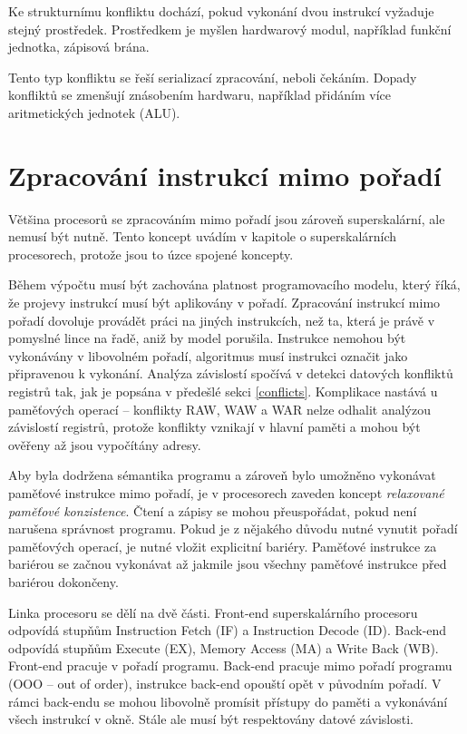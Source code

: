 Ke strukturnímu konfliktu dochází, pokud vykonání dvou instrukcí vyžaduje stejný prostředek.
Prostředkem je myšlen hardwarový modul, například funkční jednotka, zápisová brána.

Tento typ konfliktu se řeší serializací zpracování, neboli čekáním.
Dopady konfliktů se zmenšují znásobením hardwaru, například přidáním více aritmetických jednotek (ALU).

\section{Zpracování instrukcí mimo pořadí}
\label{chap:ooo}

Většina procesorů se zpracováním mimo pořadí jsou zároveň superskalární, ale nemusí být nutně.
Tento koncept uvádím v kapitole o superskalárních procesorech, protože jsou to úzce spojené koncepty.

Během výpočtu musí být zachována platnost programovacího modelu, který říká, že projevy instrukcí musí být aplikovány v pořadí.
Zpracování instrukcí mimo pořadí dovoluje provádět práci na jiných instrukcích, než ta, která je právě v pomyslné lince na řadě, aniž by model porušila.
Instrukce nemohou být vykonávány v libovolném pořadí, algoritmus musí instrukci označit jako připravenou k vykonání.
Analýza závislostí spočívá v detekci datových konfliktů registrů tak, jak je popsána v předešlé sekci \ref{conflicts}.
Komplikace nastává u paměťových operací -- konflikty RAW, WAW a WAR nelze odhalit analýzou závislostí registrů, protože konflikty vznikají v hlavní paměti a mohou být ověřeny až jsou vypočítány adresy. 

Aby byla dodržena sémantika programu a zároveň bylo umožněno vykonávat paměťové instrukce mimo pořadí, je v procesorech zaveden koncept \emph{relaxované paměťové konzistence}.
Čtení a zápisy se mohou přeuspořádat, pokud není narušena správnost programu.
Pokud je z nějakého důvodu nutné vynutit pořadí paměťových operací, je nutné vložit explicitní bariéry.
Paměťové instrukce za bariérou se začnou vykonávat až jakmile jsou všechny paměťové instrukce před bariérou dokončeny.

Linka procesoru se dělí na dvě části. 
Front-end superskalárního procesoru odpovídá stupňům Instruction Fetch (IF) a Instruction Decode (ID).
Back-end odpovídá stupňům Execute (EX), Memory Access (MA) a Write Back (WB).
Front-end pracuje v pořadí programu.
Back-end pracuje mimo pořadí programu (OOO -- out of order), instrukce back-end opouští opět v původním pořadí.
V rámci back-endu se mohou libovolně promísit přístupy do paměti a vykonávání všech instrukcí v okně. Stále ale musí být respektovány datové závislosti.

